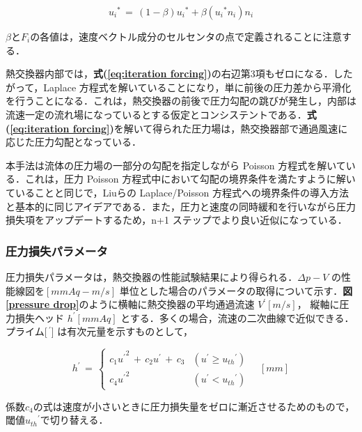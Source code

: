 \begin{equation}
{u_{i}}^{*}
\, =\,
(1-\beta) {u_{i}}^{*} + \beta \left({ {u_{i}}^{*} n_{i} }\right) n_{i}
\label{eq:projection_ng_pl}
\end{equation}

\noindent $\beta$と$F_{i}$の各値は，速度ベクトル成分のセルセンタの点で定義されることに注意する．

熱交換器内部では，\textbf{式(\ref{eq:iteration forcing})}の右辺第3項もゼロになる．したがって，Laplace 方程式を解いていることになり，単に前後の圧力差から平滑化を行うことになる．これは，熱交換器の前後で圧力勾配の跳びが発生し，内部は流速一定の流れ場になっているとする仮定とコンシステントである．\textbf{式(\ref{eq:iteration forcing})}を解いて得られた圧力場は，熱交換器部で通過風速に応じた圧力勾配となっている．

本手法は流体の圧力場の一部分の勾配を指定しながら Poisson 方程式を解いている．これは，圧力 Poisson 方程式中において勾配の境界条件を満たすように解いていることと同じで，Liuら\cite{Liu:00:JCP}の Laplace/Poisson 方程式への境界条件の導入方法と基本的に同じアイデアである．また，圧力と速度の同時緩和を行いながら圧力損失項をアップデートするため，n+1 ステップでより良い近似になっている．


%
\subsubsection{圧力損失パラメータ}
圧力損失パラメータは，熱交換器の性能試験結果により得られる．$\Delta p-V$ の性能線図を$[mmAq - m/s]$ 単位とした場合のパラメータの取得について示す．\textbf{図\ref{pressure drop}}のように横軸に熱交換器の平均通過流速 $V^{\prime} [m/s]$， 縦軸に圧力損失ヘッド $h^{\prime} [mmAq]$ とする．多くの場合，流速の二次曲線で近似できる．プライム[$\,^{\prime}$] は有次元量を示すものとして，

\begin{equation}
{h}^{\prime} 
\,=\,
\left\{{ \begin{array}{ll}
c_{1} {u^{\prime}}^{2} \,+\, c_{2} u^{\prime} \,+\, c_{3} & \left({ u^{\prime} \geq {u_{th}}^{\prime} }\right)\\
c_{4} {u^{\prime}}^{2} & \left({ u^{\prime} < {u_{th}}^{\prime} }\right)
\end{array}}\right. \quad [mm]
\label{eq:coef1_pl}
\end{equation}

\noindent 係数$c_{4}$の式は速度が小さいときに圧力損失量をゼロに漸近させるためのもので，閾値${u_{th}}^{\prime}$で切り替える．\\

